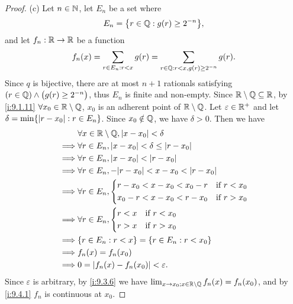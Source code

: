 \begin{proof}{(c)}
  Let \(n \in \mathbb{N}\), let \(E_n\) be a set where
  \[
    E_n = \set{r \in \Q : g(r) \geq 2^{-n}},
  \]
  and let \(f_n : \mathbb{R} \to \mathbb{R}\) be a function
  \[
    f_n(x) = \sum_{r \in E_n : r < x} g(r) = \sum_{r \in \mathbb{Q} : r < x, g(r) \geq 2^{-n}} g(r).
  \]
  Since \(q\) is bijective, there are at most \(n + 1\) rationals satisfying \((r \in \mathbb{Q}) \land \big(g(r) \geq 2^{-n}\big)\), thus \(E_n\) is finite and non-empty.
  Since \(\mathbb{R} \setminus \mathbb{Q} \subseteq \mathbb{R}\), by \cref{i:9.1.11} \(\forall x_0 \in \mathbb{R} \setminus \mathbb{Q}\), \(x_0\) is an adherent point of \(\mathbb{R} \setminus \mathbb{Q}\).
  Let \(\varepsilon \in \mathbb{R}^+\) and let \(\delta = \min\set{\abs{r - x_0} : r \in E_n}\).
  Since \(x_0 \notin \mathbb{Q}\), we have \(\delta > 0\).
  Then we have
  \begin{align*}
             & \forall x \in \R \setminus \Q, \abs{x - x_0} < \delta               \\
    \implies & \forall r \in E_n, \abs{x - x_0} < \delta \leq \abs{r - x_0}        \\
    \implies & \forall r \in E_n, \abs{x - x_0} < \abs{r - x_0}                    \\
    \implies & \forall r \in E_n, -\abs{r - x_0} < x - x_0 < \abs{r - x_0}         \\
    \implies & \forall r \in E_n, \begin{dcases}
                                    r - x_0 < x - x_0 < x_0 - r & \text{if } r < x_0 \\
                                    x_0 - r < x - x_0 < r - x_0 & \text{if } r > x_0
                                  \end{dcases} \\
    \implies & \forall r \in E_n, \begin{dcases}
                                    r < x & \text{if } r < x_0 \\
                                    r > x & \text{if } r > x_0
                                  \end{dcases}                       \\
    \implies & \set{r \in E_n : r < x} = \set{r \in E_n : r < x_0}                 \\
    \implies & f_n(x) = f_n(x_0)                                                   \\
    \implies & 0 = \abs{f_n(x) - f_n(x_0)} < \varepsilon.
  \end{align*}
  Since \(\varepsilon\) is arbitrary, by \cref{i:9.3.6} we have \(\lim_{x \to x_0 ; x \in \mathbb{R} \setminus \mathbb{Q}} f_n(x) = f_n(x_0)\), and by \cref{i:9.4.1} \(f_n\) is continuous at \(x_0\).


\end{proof}
